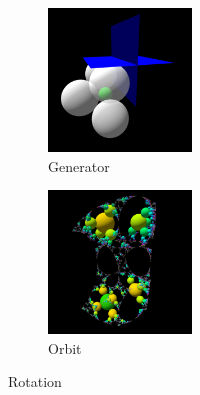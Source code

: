 \begin{figure}[h!tbp]
\begin{minipage}[t]{0.49\hsize}
  \begin{subfigure}{0.24\textwidth}
   \begin{center}
    \includegraphics[width=1.5in, height=1.5in, keepaspectratio]{../img/klein/3diis/rotationGen.pdf}
    \caption{Generator}
    \label{fig:rotationGen}
   \end{center}
  \end{subfigure}
  \hspace*{\fill}
  \begin{subfigure}{0.24\textwidth}
   \begin{center}
    \includegraphics[width=1.5in, height=1.5in, keepaspectratio]{../img/klein/3diis/rotationOrb.pdf}
    \caption{Orbit}
    \label{fig:rotationOrb}
   \end{center}
  \end{subfigure}
  \hspace*{\fill}
  \caption{Rotation}
  \label{fig:rotation3d}
 \end{minipage}
\end{figure}

